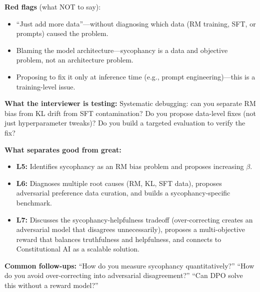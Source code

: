 \begin{interviewq}
\textbf{Red flags} (what NOT to say):
\begin{itemize}
    \item ``Just add more data''---without diagnosing which data (RM training, SFT, or prompts) caused the problem.
    \item Blaming the model architecture---sycophancy is a data and objective problem, not an architecture problem.
    \item Proposing to fix it only at inference time (e.g., prompt engineering)---this is a training-level issue.
\end{itemize}

\textbf{What the interviewer is testing:} Systematic debugging: can you separate RM bias from KL drift from SFT contamination? Do you propose data-level fixes (not just hyperparameter tweaks)? Do you build a targeted evaluation to verify the fix?

\textbf{What separates good from great:}
\begin{itemize}
    \item \textbf{L5:} Identifies sycophancy as an RM bias problem and proposes increasing $\beta$.
    \item \textbf{L6:} Diagnoses multiple root causes (RM, KL, SFT data), proposes adversarial preference data curation, and builds a sycophancy-specific benchmark.
    \item \textbf{L7:} Discusses the sycophancy-helpfulness tradeoff (over-correcting creates an adversarial model that disagrees unnecessarily), proposes a multi-objective reward that balances truthfulness and helpfulness, and connects to Constitutional AI as a scalable solution.
\end{itemize}

\textbf{Common follow-ups:} ``How do you measure sycophancy quantitatively?'' ``How do you avoid over-correcting into adversarial disagreement?'' ``Can DPO solve this without a reward model?''
\end{interviewq}


